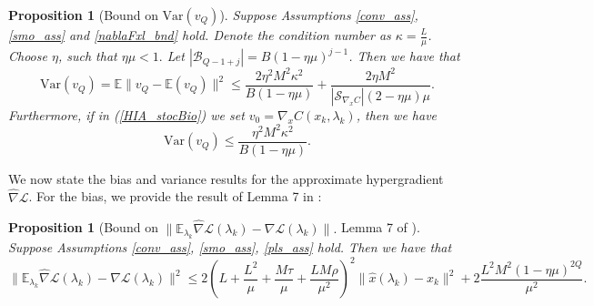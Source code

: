 \documentclass[11pt, twoside]{report}
\newtheorem{proposition}[theorem]{Proposition}
\begin{document}
\begin{proposition}[Bound on $\mathrm{Var}(v_Q)$] \label{varvq_better}
Suppose Assumptions \ref{conv_ass}, \ref{smo_ass} and \ref{nablaFxl_bnd} hold. Denote the condition number as $\kappa = \frac{L}{\mu}$. Choose $\eta$, such that $\eta \mu < 1.$ Let $|\mathcal{B}_{Q-1+j}| = B(1-\eta\mu)^{j-1}$. Then we have that
    \[\mathrm{Var}(v_Q) = \mathbb{E}\|v_Q - \mathbb{E}(v_Q)\|^2 \leq   \frac{2 \eta^2M^2 \kappa^2 }{B(1-\eta\mu)} + \frac{2 \eta M^2}{|\mathcal{S}_{\nabla_x C}| (2 - \eta \mu)\mu}.\]
    Furthermore, if in (\ref{HIA_stocBio}) we set $v_0 = \nabla_x C(x_k,\lambda_k)$, then we have
    \[\mathrm{Var}(v_Q) \leq   \frac{\eta^2M^2 \kappa^2 }{B(1-\eta\mu)}.\]
\end{proposition}

We now state the bias and variance results for the approximate hypergradient $\widehat{\nabla} \mathcal{L}$. For the bias, we provide the result of Lemma 7 in \cite{ji2021bilevel}:
\begin{proposition}[Bound on $\|\mathbb{E}_{\lambda_k} \widehat{\nabla} \mathcal{L}(\lambda_k) - \nabla \mathcal{L}(\lambda_k)\|.$ Lemma 7 of \cite{ji2021bilevel}] \label{nabla_hat_nabla_bnd}
Suppose Assumptions \ref{conv_ass}, \ref{smo_ass}, \ref{pls_ass} hold. Then we have that 
\[\|\mathbb{E}_{\lambda_k} \widehat{\nabla} \mathcal{L}(\lambda_k) - \nabla \mathcal{L}(\lambda_k)\|^2 \leq 2\left(L + \frac{L^2}{\mu} + \frac{M\tau}{\mu} + \frac{LM\rho}{\mu^2} \right)^2 \|\hat{x}(\lambda_k) - x_k\|^2 + 2 \frac{L^2M^2(1-\eta \mu)^{2Q}}{\mu^2}.\]
\end{proposition}
\end{document}
